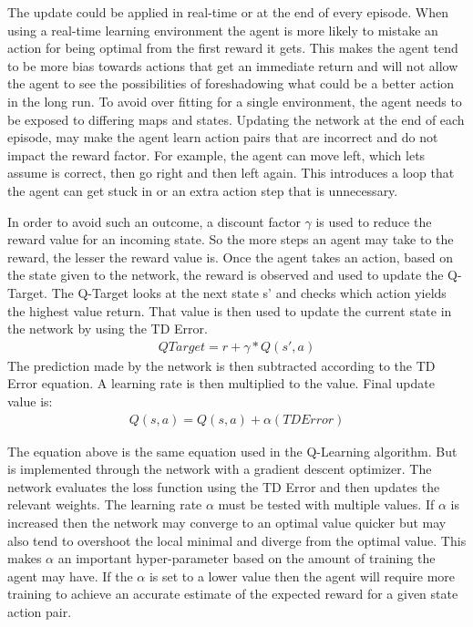The update could be applied in real-time or at the end of every episode.
When using a real-time learning environment the agent is more likely to mistake an action for being optimal from the first reward it gets. This makes the agent tend to be more bias towards actions that get an immediate return and will not allow the agent to see the possibilities of foreshadowing what could be a better action in the long run. To avoid over fitting for a single environment, the agent needs to be exposed to differing maps and states. Updating the network at the end of each episode, may make the agent learn action pairs that are incorrect and do not impact the reward factor. For example, the agent can move left, which lets assume is correct, then go right and then left again. This introduces a loop that the agent can get stuck in or an extra action step that is unnecessary. 

In order to avoid such an outcome, a discount factor $\gamma$ is used to reduce the reward value for an incoming state. So the more steps an agent may take to the reward, the lesser the reward value is. 
Once the agent takes an action, based on the state given to the network, the reward is observed and used to update the Q-Target. The Q-Target looks at the next state s' and checks which action yields the highest value return. That value is then used to update the current state in the network by using the TD Error.
\begin{align}
QTarget = r + \gamma*Q(s',a)
\end{align}
The prediction made by the network is then subtracted according to the TD Error equation. A learning rate is then multiplied to the value.
Final update value is:
\begin{align}
Q(s,a) = Q(s,a) + \alpha (TDError)
\end{align}

The equation above is the same equation used in the Q-Learning algorithm. But is implemented through the network with a gradient descent optimizer. The network evaluates the loss function using the TD Error and then updates the relevant weights. The learning rate $\alpha$ must be tested with multiple values. If $\alpha$ is increased then the network may converge to an optimal value quicker but may also tend to overshoot the local minimal and diverge from the optimal value. This makes $\alpha$ an important hyper-parameter based on the amount of training the agent may have. If the $\alpha$ is set to a lower value then the agent will require more training to achieve an accurate estimate of the expected reward for a given state action pair. 

